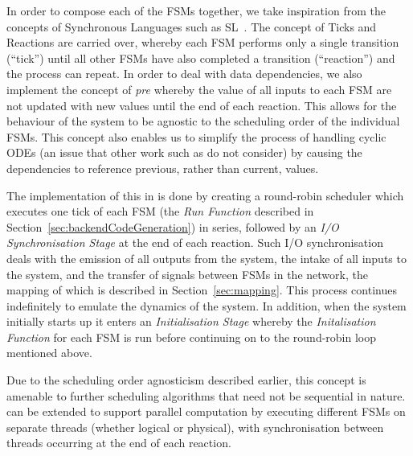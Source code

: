 %  

In order to compose each of the \acp{FSM} together, we take inspiration
from the concepts of Synchronous Languages such as SL~\cite{SlLanguage}.  The 
concept of Ticks and Reactions are carried over, whereby each \ac{FSM} performs 
only a single transition (``tick'') until all other \acp{FSM} have also 
completed a transition (``reaction'') and the process can repeat.  In order to
deal with data dependencies, we also implement the concept of \emph{pre}
whereby the value of all inputs to each \ac{FSM} are not updated with
new values until the end of each reaction.  This allows for the behaviour of 
the system to be agnostic to the scheduling order of the individual 
\acp{FSM}.  This concept also enables us to simplify the process of 
handling cyclic \acp{ODE} (an issue that other work such as 
\cite{kim2003modular} do not consider) by causing the dependencies to reference
previous, rather than current, values.

The implementation of this in \ourTool is done by creating a round-robin
scheduler which executes one tick of each \ac{FSM} (the \emph{Run Function} 
described in Section~\ref{sec:backendCodeGeneration}) in series, followed by an 
\emph{I/O Synchronisation Stage} at the end of each reaction.  Such I/O 
synchronisation deals with the emission of all outputs from the system, the 
intake of all inputs to the system, and the transfer of signals between 
\acp{FSM} in the network, the mapping of which is described in  
Section~\ref{sec:mapping}.  This process continues indefinitely to emulate the 
dynamics of the system.  In addition, when the system initially starts up it 
enters an \emph{Initialisation Stage} whereby the \emph{Initalisation Function} 
for each \ac{FSM} is run before continuing on to the round-robin loop mentioned 
above.

Due to the scheduling order agnosticism described earlier, this concept is 
amenable to further scheduling algorithms that need not be sequential in 
nature.  \ourTool can be extended to support parallel computation by executing 
different \acp{FSM} on separate threads (whether logical or physical), with 
synchronisation between threads occurring at the end of each reaction.
